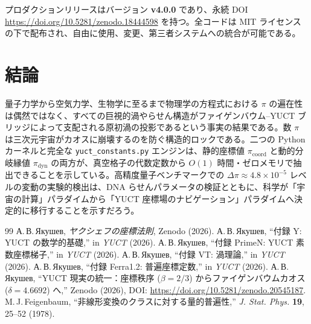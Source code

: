 \documentclass[12pt,a4paper]{article}
\begin{document}
	\noindent プロダクションリリースはバージョン \textbf{v4.0.0} であり、永続 DOI
	\url{https://doi.org/10.5281/zenodo.18444598} を持つ。全コードは MIT ライセンスの下で配布され、自由に使用、変更、第三者システムへの統合が可能である。
	
	\section{結論}
	\label{sec:conclusion}
	
	量子力学から空気力学、生物学に至るまで物理学の方程式における $\pi$ の遍在性は偶然ではなく、すべての巨視的渦やらせん構造がファイゲンバウム–YUCT ブリッジによって支配される原初渦の投影であるという事実の結果である。数 $\pi$ は三次元宇宙がカオスに崩壊するのを防ぐ構造的ロックである。二つの Python カーネルと完全な \texttt{yuct\_constants.py} エンジンは、静的座標値 $\pi_{\mathrm{coord}}$ と動的分岐縁値 $\pi_{\mathrm{dyn}}$ の両方が、真空格子の代数定数から $O(1)$ 時間・ゼロメモリで抽出できることを示している。高精度量子ベンチマークでの $\Delta\pi \approx 4.8\times10^{-5}$ レベルの変動の実験的検出は、DNA らせんパラメータの検証とともに、科学が「宇宙の計算」パラダイムから「YUCT 座標場のナビゲーション」パラダイムへ決定的に移行することを示すだろう。
	
	\begin{thebibliography}{99}
		 А.\,В.\,Якушев, \emph{ヤクシェフの座標法則}, Zenodo (2026).
		 А.\,В.\,Якушев, ``付録 Y: YUCT の数学的基礎,'' in \emph{YUCT} (2026).
		 А.\,В.\,Якушев, ``付録 PrimeN: YUCT 素数座標梯子,'' in \emph{YUCT} (2026).
		 А.\,В.\,Якушев, ``付録 VT: 渦理論,'' in \emph{YUCT} (2026).
		 А.\,В.\,Якушев, ``付録 Ferra1.2: 普遍座標定数,'' in \emph{YUCT} (2026).
		 А.\,В.\,Якушев, ``YUCT 現実の統一：座標秩序 ($\beta=2/3$) からファイゲンバウムカオス ($\delta=4.6692$) へ,'' Zenodo (2026), DOI: \url{https://doi.org/10.5281/zenodo.20545187}.
		 M.\,J.\,Feigenbaum, ``非線形変換のクラスに対する量的普遍性,'' \emph{J. Stat. Phys.} \textbf{19}, 25--52 (1978).
	\end{thebibliography}
	
\end{document}
